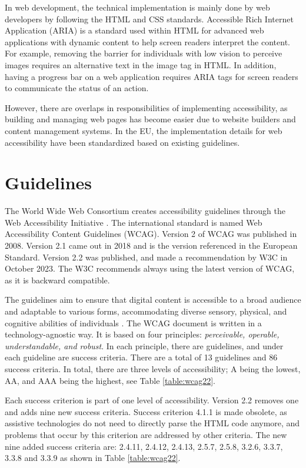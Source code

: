 In web development, the technical implementation is mainly done by web developers by following the HTML and CSS standards. Accessible Rich Internet Application (ARIA) is a standard used within HTML for advanced web applications with dynamic content to help screen readers interpret the content. For example, removing the barrier for individuals with low vision to perceive images requires an alternative text in the image tag in HTML. In addition, having a progress bar on a web application requires ARIA tags for screen readers to communicate the status of an action.

However, there are overlaps in responsibilities of implementing accessibility, as building and managing web pages has become easier due to website builders and content management systems. In the EU, the implementation details for web accessibility have been standardized based on existing guidelines.

\section{Guidelines}

The World Wide Web Consortium creates accessibility guidelines through the Web Accessibility Initiative \citep{wcagoverview}. The international standard is named Web Accessibility Content Guidelines (WCAG). Version 2 of WCAG was published in 2008. Version 2.1 came out in 2018 and is the version referenced in the European Standard. Version 2.2 was published, and made a recommendation by W3C in October 2023. The W3C recommends always using the latest version of WCAG, as it is backward compatible. 

The guidelines aim to ensure that digital content is accessible to a broad audience and adaptable to various forms, accommodating diverse sensory, physical, and cognitive abilities of individuals \citep{wcag22}. The WCAG document is written in a technology-agnostic way. It is based on four principles: \textit{perceivable, operable, understandable, and robust}. In each principle, there are guidelines, and under each guideline are success criteria. There are a total of 13 guidelines and 86 success criteria. In total, there are three levels of accessibility; A being the lowest, AA, and AAA being the highest, see Table \ref{table:wcag22}. 



Each success criterion is part of one level of accessibility. Version 2.2 removes one and adds nine new success criteria. Success criterion 4.1.1 is made obsolete, as assistive technologies do not need to directly parse the HTML code anymore, and problems that occur by this criterion are addressed by other criteria. The new nine added success criteria are: 2.4.11, 2.4.12, 2.4.13, 2.5.7, 2.5.8, 3.2.6, 3.3.7, 3.3.8 and 3.3.9 as shown in Table \ref{table:wcag22}. 

